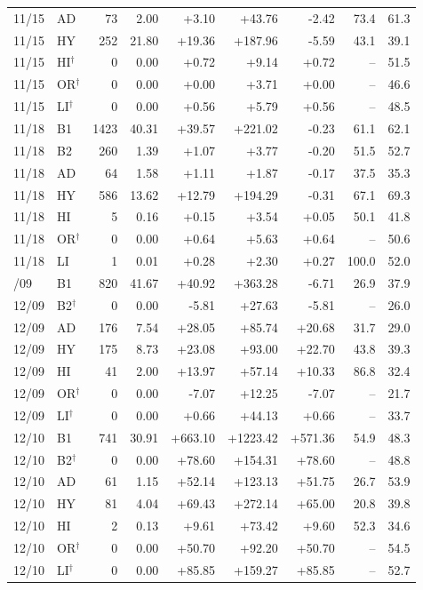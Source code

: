 \begin{longtable}{@{}llrrrrrrr@{}}
11/15 & AD & 73 & 2.00 & +3.10 & +43.76 & -2.42 & 73.4 & 61.3 \\
11/15 & HY & 252 & 21.80 & +19.36 & +187.96 & -5.59 & 43.1 & 39.1 \\
11/15 & HI$^{\dagger}$ & 0 & 0.00 & +0.72 & +9.14 & +0.72 & -- & 51.5 \\
11/15 & OR$^{\dagger}$ & 0 & 0.00 & +0.00 & +3.71 & +0.00 & -- & 46.6 \\
11/15 & LI$^{\dagger}$ & 0 & 0.00 & +0.56 & +5.79 & +0.56 & -- & 48.5 \\
\midrule
11/18 & B1 & 1423 & 40.31 & +39.57 & +221.02 & -0.23 & 61.1 & 62.1 \\
11/18 & B2 & 260 & 1.39 & +1.07 & +3.77 & -0.20 & 51.5 & 52.7 \\
11/18 & AD & 64 & 1.58 & +1.11 & +1.87 & -0.17 & 37.5 & 35.3 \\
11/18 & HY & 586 & 13.62 & +12.79 & +194.29 & -0.31 & 67.1 & 69.3 \\
11/18 & HI & 5 & 0.16 & +0.15 & +3.54 & +0.05 & 50.1 & 41.8 \\
11/18 & OR$^{\dagger}$ & 0 & 0.00 & +0.64 & +5.63 & +0.64 & -- & 50.6 \\
11/18 & LI & 1 & 0.01 & +0.28 & +2.30 & +0.27 & 100.0 & 52.0 \\
\pagebreak
12/09 & B1 & 820 & 41.67 & +40.92 & +363.28 & -6.71 & 26.9 & 37.9 \\
12/09 & B2$^{\dagger}$ & 0 & 0.00 & -5.81 & +27.63 & -5.81 & -- & 26.0 \\
12/09 & AD & 176 & 7.54 & +28.05 & +85.74 & +20.68 & 31.7 & 29.0 \\
12/09 & HY & 175 & 8.73 & +23.08 & +93.00 & +22.70 & 43.8 & 39.3 \\
12/09 & HI & 41 & 2.00 & +13.97 & +57.14 & +10.33 & 86.8 & 32.4 \\
12/09 & OR$^{\dagger}$ & 0 & 0.00 & -7.07 & +12.25 & -7.07 & -- & 21.7 \\
12/09 & LI$^{\dagger}$ & 0 & 0.00 & +0.66 & +44.13 & +0.66 & -- & 33.7 \\
\midrule
12/10 & B1 & 741 & 30.91 & +663.10 & +1223.42 & +571.36 & 54.9 & 48.3 \\
12/10 & B2$^{\dagger}$ & 0 & 0.00 & +78.60 & +154.31 & +78.60 & -- & 48.8 \\
12/10 & AD & 61 & 1.15 & +52.14 & +123.13 & +51.75 & 26.7 & 53.9 \\
12/10 & HY & 81 & 4.04 & +69.43 & +272.14 & +65.00 & 20.8 & 39.8 \\
12/10 & HI & 2 & 0.13 & +9.61 & +73.42 & +9.60 & 52.3 & 34.6 \\
12/10 & OR$^{\dagger}$ & 0 & 0.00 & +50.70 & +92.20 & +50.70 & -- & 54.5 \\
12/10 & LI$^{\dagger}$ & 0 & 0.00 & +85.85 & +159.27 & +85.85 & -- & 52.7 \\
\end{longtable}

